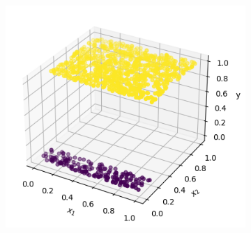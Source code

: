 \documentclass[a4paper]{article}
\theoremstyle{definition}
\newenvironment{soln}{
    \leavevmode\color{blue}\ignorespaces
}{}
\begin{document}
\begin{enumerate}
\begin{itemize}
\begin{soln}
\begin{figure}[H]
\begin{subfigure}{0.5\textwidth}
                \includegraphics[scale=0.3]{Images/Q6/DTq6d1_3d.png}
            \end{subfigure}
            \label{fig:q6_d1}
        \end{figure}
        

\end{soln}
\end{itemize}
\end{enumerate}
\end{document}
